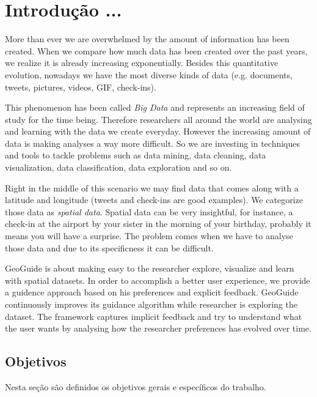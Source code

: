 \chapter{Introdução ...}
\label{chap:introducao}

More than ever we are overwhelmed by the amount of information has been created.
When we compare how much data has been created over the past years, we realize
it is already increasing exponentially.
Besides this quantitative evolution, nowadays
we have the most diverse kinds of data
(e.g. documents, tweets, pictures, videos, GIF, check-ins).

This phenomenon has been called \textit{Big Data} and represents an increasing field of study
for the time being. Therefore researchers all around the world
are analysing and learning with the data we create everyday. 
However the increasing amount of data is making analyses a way more difficult.
So we are investing in techniques and tools to tackle problems such as data mining, data cleaning,
data visualization, data classification, data exploration and so on.

Right in the middle of this scenario we may find data that comes along with a latitude and longitude
(tweets and check-ins are good examples). We categorize those data as \textit{spatial data}.
Spatial data can be very insightful, for instance, a check-in at the airport by your sister
in the morning of your birthday, probably it means you will have a surprise.
The problem comes when we have to analyse those data and due to its specificness it can
be difficult. %

GeoGuide is about making easy to the researcher explore, visualize and learn with spatial datasets.
In order to accomplish a better user experience, we provide a guidence approach based
on his preferences and explicit feedback.
GeoGuide continuously improves its guidance algorithm while
researcher is exploring the dataset. The framework captures implicit feedback
and try to understand what the user wants by analysing how the
researcher preferences has evolved over time.

\section{Objetivos}

Nesta seção são definidos os objetivos gerais e específicos do trabalho.

